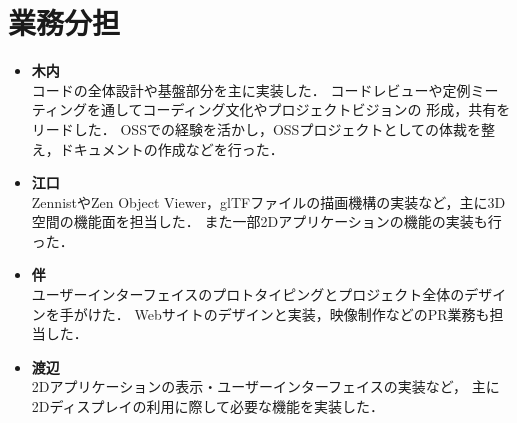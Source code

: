 \section{業務分担}


\begin{itemize}
  \item \textbf{木内} \\
        コードの全体設計や基盤部分を主に実装した．
        コードレビューや定例ミーティングを通してコーディング文化やプロジェクトビジョンの
        形成，共有をリードした．
        OSSでの経験を活かし，OSSプロジェクトとしての体裁を整え，ドキュメントの作成などを行った．
  \item \textbf{江口} \\
        ZennistやZen Object Viewer，glTFファイルの描画機構の実装など，主に3D空間の機能面を担当した．
        また一部2Dアプリケーションの機能の実装も行った．
  \item \textbf{伴} \\
        ユーザーインターフェイスのプロトタイピングとプロジェクト全体のデザインを手がけた．
        Webサイトのデザインと実装，映像制作などのPR業務も担当した．
  \item \textbf{渡辺} \\
        2Dアプリケーションの表示・ユーザーインターフェイスの実装など，
        主に2Dディスプレイの利用に際して必要な機能を実装した．
\end{itemize}
